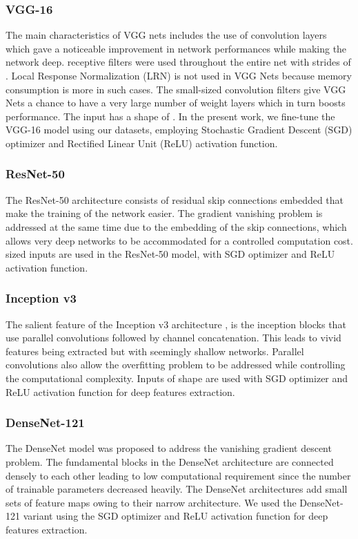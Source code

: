 \documentclass{llncs}
\begin{document}
\subsubsection{VGG-16}
The main characteristics of VGG nets \cite{simonyan2014very} includes the use of  convolution layers which gave a noticeable improvement in network performances while making the network deep.  receptive filters were used throughout the entire net with strides of . Local Response Normalization (LRN) is not used in VGG Nets because memory consumption is more in such cases. The small-sized convolution filters give VGG Nets a chance to have a very large number of weight layers which in turn boosts performance. The input has a shape of . In the present work, we fine-tune the VGG-16 model using our datasets, employing Stochastic Gradient Descent (SGD) optimizer and Rectified Linear Unit (ReLU) activation function.
\subsubsection{ResNet-50}
The ResNet-50 architecture \cite{he2016deep} consists of residual skip connections embedded that make the training of the network easier. The gradient vanishing problem is addressed at the same time due to the embedding of the skip connections, which allows very deep networks to be accommodated for a controlled computation cost.  sized inputs are used in the ResNet-50 model, with SGD optimizer and ReLU activation function.
\subsubsection{Inception v3}
The salient feature of the Inception v3 architecture \cite{szegedy2016rethinking}, is the inception blocks that use parallel convolutions followed by channel concatenation. This leads to vivid features being extracted but with seemingly shallow networks. Parallel convolutions also allow the overfitting problem to be addressed while controlling the computational complexity. Inputs of shape  are used with SGD optimizer and ReLU activation function for deep features extraction.
\subsubsection{DenseNet-121}
The DenseNet model \cite{huang2017densely} was proposed to address the vanishing gradient descent problem. The fundamental blocks in the DenseNet architecture are connected densely to each other leading to low computational requirement since the number of trainable parameters decreased heavily. The DenseNet architectures add small sets of feature maps owing to their narrow architecture. We used the DenseNet-121 variant using the SGD optimizer and ReLU activation function for deep features extraction.
\end{document}
